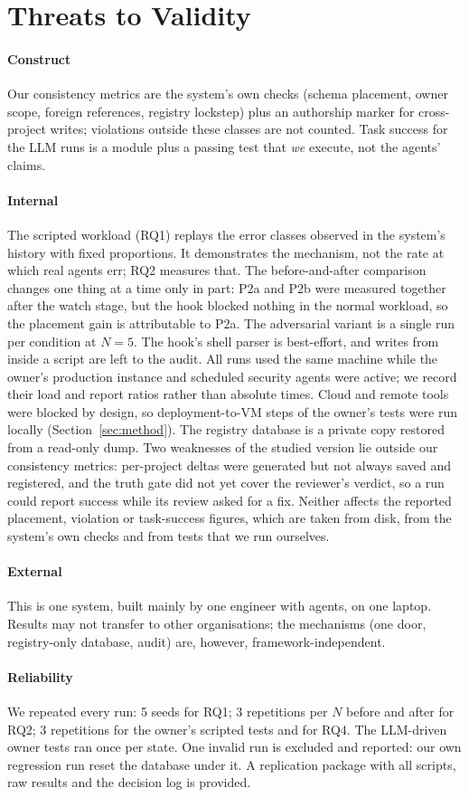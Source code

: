 \section{Threats to Validity}\label{sec:threats}
\paragraph*{Construct} Our consistency metrics are the system's own checks (schema placement, owner scope, foreign references, registry lockstep) plus an authorship marker for cross-project writes; violations outside these classes are not counted. Task success for the LLM runs is a module plus a passing test that \emph{we} execute, not the agents' claims.
\paragraph*{Internal} The scripted workload (RQ1) replays the error classes observed in the system's history with fixed proportions. It demonstrates the mechanism, not the rate at which real agents err; RQ2 measures that. The before-and-after comparison changes one thing at a time only in part: P2a and P2b were measured together after the watch stage, but the hook blocked nothing in the normal workload, so the placement gain is attributable to P2a. The adversarial variant is a single run per condition at $N=5$. The hook's shell parser is best-effort, and writes from inside a script are left to the audit. All runs used the same machine while the owner's production instance and scheduled security agents were active; we record their load and report ratios rather than absolute times. Cloud and remote tools were blocked by design, so deployment-to-VM steps of the owner's tests were run locally (Section~\ref{sec:method}). The registry database is a private copy restored from a read-only dump. Two weaknesses of the studied version lie outside our consistency metrics: per-project deltas were generated but not always saved and registered, and the truth gate did not yet cover the reviewer's verdict, so a run could report success while its review asked for a fix. Neither affects the reported placement, violation or task-success figures, which are taken from disk, from the system's own checks and from tests that we run ourselves.
\paragraph*{External} This is one system, built mainly by one engineer with agents, on one laptop. Results may not transfer to other organisations; the mechanisms (one door, registry-only database, audit) are, however, framework-independent.
\paragraph*{Reliability} We repeated every run: 5 seeds for RQ1; 3 repetitions per $N$ before and after for RQ2; 3 repetitions for the owner's scripted tests and for RQ4. The LLM-driven owner tests ran once per state. One invalid run is excluded and reported: our own regression run reset the database under it. A replication package with all scripts, raw results and the decision log is provided.
